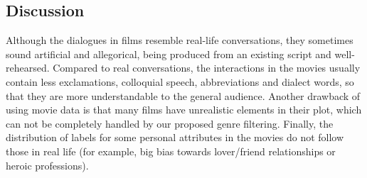 \subsection{Discussion}

Although the dialogues in films resemble real-life conversations, they sometimes sound artificial and allegorical, being produced from an existing script and well-rehearsed. Compared to real conversations, the interactions in the movies usually contain less exclamations, colloquial speech, abbreviations and dialect words, so that they are more understandable to the general audience. Another drawback of using movie data is that many films have unrealistic elements in their plot, which can not be completely handled by our proposed genre filtering. Finally, the distribution of labels for some personal attributes in the movies do not follow those in real life (for example, big bias towards lover/friend relationships or heroic professions).




